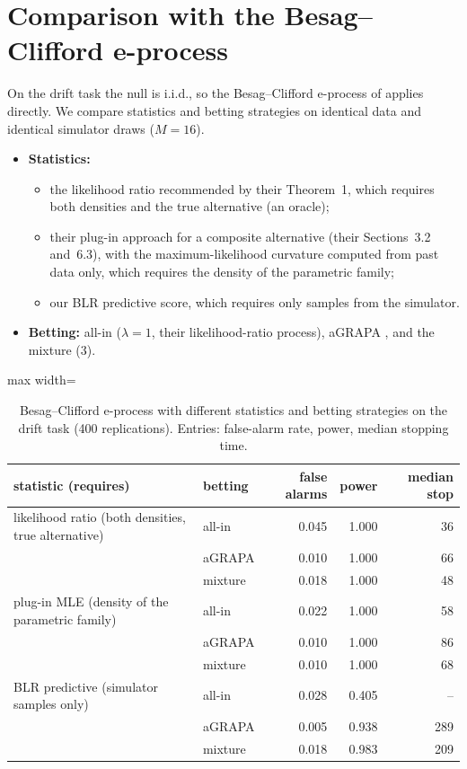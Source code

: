 \documentclass[11pt]{article}
\theoremstyle{remark}
\begin{document}
\section{Comparison with the Besag--Clifford e-process}\label{sec:exp-bc}

On the drift task the null is i.i.d., so the Besag--Clifford e-process of
\citet{dombowsky2026besag} applies directly. We compare statistics and betting
strategies on identical data and identical simulator draws ($M = 16$).
\begin{itemize}
  \item \textbf{Statistics:}
        \begin{itemize}
          \item the likelihood ratio recommended by their Theorem~1, which
                requires both densities and the true alternative (an oracle);
          \item their plug-in approach for a composite alternative (their
                Sections~3.2 and~6.3), with the maximum-likelihood curvature
                computed from past data only, which requires the density of the
                parametric family;
          \item our BLR predictive score, which requires only samples from the
                simulator.
        \end{itemize}
  \item \textbf{Betting:} all-in ($\lambda = 1$, their likelihood-ratio
        process), aGRAPA \citep{waudbysmith2024estimating}, and the mixture
        (3).
\end{itemize}

\begin{table}[t]
\centering
\caption{Besag--Clifford e-process with different statistics and betting
strategies on the drift task (400 replications). Entries: false-alarm rate,
power, median stopping time.}
\label{tab:bc}
\begin{adjustbox}{max width=\textwidth}
\begin{tabular}{llrrr}
\toprule
statistic (requires) & betting & false alarms & power & median stop \\
\midrule
likelihood ratio (both densities, true alternative) & all-in & 0.045 & 1.000 & 36 \\
 & aGRAPA & 0.010 & 1.000 & 66 \\
 & mixture & 0.018 & 1.000 & 48 \\
plug-in MLE (density of the parametric family) & all-in & 0.022 & 1.000 & 58 \\
 & aGRAPA & 0.010 & 1.000 & 86 \\
 & mixture & 0.010 & 1.000 & 68 \\
BLR predictive (simulator samples only) & all-in & 0.028 & 0.405 & -- \\
 & aGRAPA & 0.005 & 0.938 & 289 \\
 & mixture & 0.018 & 0.983 & 209 \\
\bottomrule
\end{tabular}
\end{adjustbox}
\end{table}
\end{document}

